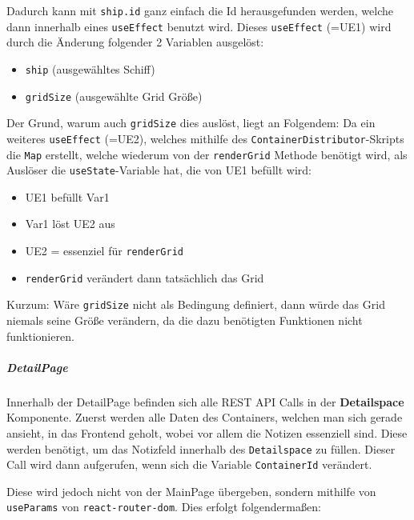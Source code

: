 \documentclass[
    headings=optiontotocandhead,%
    twoside,
    numbers=noenddot,%
    12pt, %
    titlepage, %
    parskip=full, %
    listof=leveldown, 
    numbers=noenddot, %
    a4paper,DIV=14,
    BCOR=15mm,
]{scrbook}
\newcommand{\passthrough}[1]{#1}
\providecommand{\tightlist}{%
  \setlength{\itemsep}{0pt}\setlength{\parskip}{0pt}}
\begin{document}
Dadurch kann mit \passthrough{\lstinline!ship.id!} ganz einfach die Id
herausgefunden werden, welche dann innerhalb eines
\passthrough{\lstinline!useEffect!} benutzt wird. Dieses
\passthrough{\lstinline!useEffect!} (=UE1) wird durch die Änderung
folgender 2 Variablen ausgelöst:

\begin{itemize}
\tightlist
\item
  \passthrough{\lstinline!ship!} (ausgewähltes Schiff)
\item
  \passthrough{\lstinline!gridSize!} (ausgewählte Grid Größe)
\end{itemize}

Der Grund, warum auch \passthrough{\lstinline!gridSize!} dies auslöst,
liegt an Folgendem: Da ein weiteres \passthrough{\lstinline!useEffect!}
(=UE2), welches mithilfe des
\passthrough{\lstinline!ContainerDistributor!}-Skripts die
\passthrough{\lstinline!Map!} erstellt, welche wiederum von der
\passthrough{\lstinline!renderGrid!} Methode benötigt wird, als Auslöser
die \passthrough{\lstinline!useState!}-Variable hat, die von UE1 befüllt
wird:

\begin{itemize}
\tightlist
\item
  UE1 befüllt Var1
\item
  Var1 löst UE2 aus
\item
  UE2 = essenziel für \passthrough{\lstinline!renderGrid!}
\item
  \passthrough{\lstinline!renderGrid!} verändert dann tatsächlich das
  Grid
\end{itemize}

Kurzum: Wäre \passthrough{\lstinline!gridSize!} nicht als Bedingung
definiert, dann würde das Grid niemals seine Größe verändern, da die
dazu benötigten Funktionen nicht funktionieren.

\hypertarget{detailpage}{%
\subparagraph{DetailPage}\label{detailpage}}

Innerhalb der DetailPage befinden sich alle REST API Calls in der
\textbf{Detailspace} Komponente. Zuerst werden alle Daten des
Containers, welchen man sich gerade ansieht, in das Frontend geholt,
wobei vor allem die Notizen essenziell sind. Diese werden benötigt, um
das Notizfeld innerhalb des \passthrough{\lstinline!Detailspace!} zu
füllen. Dieser Call wird dann aufgerufen, wenn sich die Variable
\passthrough{\lstinline!ContainerId!} verändert.

Diese wird jedoch nicht von der MainPage übergeben, sondern mithilfe von
\passthrough{\lstinline!useParams!} von
\passthrough{\lstinline!react-router-dom!}. Dies erfolgt folgendermaßen:
\end{document}
